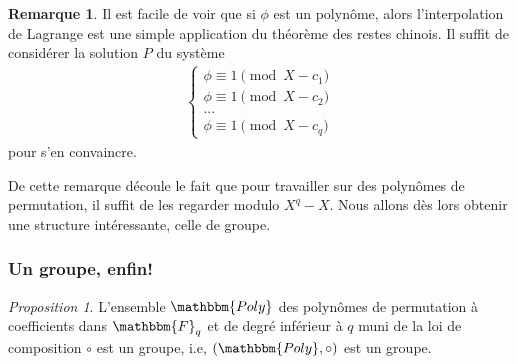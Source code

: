 \documentclass[12pt]{article}
\theoremstyle{remark}\newtheorem{note}{Note}
\theoremstyle{remark}\newtheorem{nota}{Notation}
\newcommand{\Fq}{\mathbbm{F}_q}
\newtheorem{prop}{Proposition}
\theoremstyle{definition}
\newtheorem{rem}{Remarque}
\begin{document}
\begin{rem}
Il est facile de voir que si $\phi $ est un polynôme, alors l'interpolation de Lagrange est une simple application du théorème des restes chinois. \newline
Il suffit de considérer la solution $P$ du système
	\begin{align*}
		\begin{cases}
			\phi \equiv 1 \pmod{X - c_1} \\
			\phi \equiv 1 \pmod{X - c_2} \\
			... \\
			\phi \equiv 1 \pmod{X - c_q}
  		\end{cases}
	\end{align*}
pour s'en convaincre.
\end{rem}

De cette remarque découle le fait que pour travailler sur des polynômes de permutation, il suffit de les regarder modulo $X^q - X$. Nous allons dès lors obtenir une structure intéressante, celle de groupe.

\subsubsection{Un groupe, enfin!} 

\begin{prop}
L'ensemble $\mathbbm{Poly}$ des polynômes de permutation  à coefficients dans $\Fq$ et de degré inférieur à $q$ muni de la loi de composition $\circ$ est un groupe, i.e, $(\mathbbm{Poly}, \circ)$ est un groupe.
\end{prop}
\end{document}
